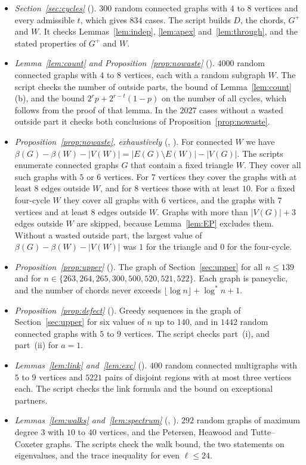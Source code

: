 \documentclass[11pt]{article}
\theoremstyle{definition}
\theoremstyle{remark}
\newcommand{\lgs}{\log^{*}}
\newcommand{\sm}{\setminus}
\begin{document}
\begin{itemize}
\item \emph{Section~\ref{sec:cycles}} (). $300$ random connected graphs with
$4$ to $8$ vertices and every admissible $t$, which gives $834$ cases. The script builds $D$, the
chords, $G^{+}$ and $W$. It checks Lemmas~\ref{lem:indep}, \ref{lem:apex} and~\ref{lem:through},
and the stated properties of $G^{+}$ and $W$.
\item \emph{Lemma~\ref{lem:count} and Proposition~\ref{prop:nowaste}}
(). $4000$ random connected graphs with $4$ to $8$ vertices, each with a
random subgraph $W$. The script checks the number of outside parts, the bound of
Lemma~\ref{lem:count}(b), and the bound $2^{r}p+2^{r-t}(1-p)$ on the number of all cycles, which follows from the proof of
that lemma. In the
$2027$ cases without a wasted outside part it checks both conclusions of
Proposition~\ref{prop:nowaste}.
\item \emph{Proposition~\ref{prop:nowaste}, exhaustively} (,
). For connected $W$ we have
$\beta(G)-\beta(W)-|V(W)|=|E(G)\sm E(W)|-|V(G)|$. The scripts enumerate connected graphs $G$
that contain a fixed triangle $W$. They cover all such graphs with $5$ or $6$ vertices. For $7$
vertices they cover the graphs with at least $8$ edges outside $W$, and for $8$ vertices those with
at least $10$. For a fixed four-cycle $W$ they cover all graphs with $6$ vertices, and the graphs
with $7$ vertices and at least $8$ edges outside $W$. Graphs with more than $|V(G)|+3$ edges outside $W$ are skipped, because
Lemma~\ref{lem:EP} excludes them. Without a wasted outside part, the largest value of
$\beta(G)-\beta(W)-|V(W)|$ was $1$ for the triangle and $0$ for the four-cycle.
\item \emph{Proposition~\ref{prop:upper}} (). The graph of
Section~\ref{sec:upper} for all $n\le139$ and for $n\in\{263,264,265,300,500,520,521,522\}$. Each
graph is pancyclic, and the number of chords never exceeds $\lfloor\log n\rfloor+\lgs n+1$.
\item \emph{Proposition~\ref{prop:defect}} (). Greedy sequences in the graph
of Section~\ref{sec:upper} for six values of $n$ up to $140$, and in $1442$ random connected graphs
with $5$ to $9$ vertices. The script checks part~(i), and part~(ii) for $a=1$.
\item \emph{Lemmas~\ref{lem:link} and~\ref{lem:exc}} (). $400$ random connected
multigraphs with $5$ to $9$ vertices and $5221$ pairs of disjoint regions with at most three
vertices each. The script checks the link formula and the bound on exceptional partners.
\item \emph{Lemmas~\ref{lem:walks} and~\ref{lem:spectrum}} (,
). $292$ random graphs of maximum degree $3$ with $10$ to $40$ vertices, and the
Petersen, Heawood and Tutte--Coxeter graphs. The scripts check the walk bound, the two statements
on eigenvalues, and the trace inequality for even $\ell\le24$.
\end{itemize}
\end{document}
